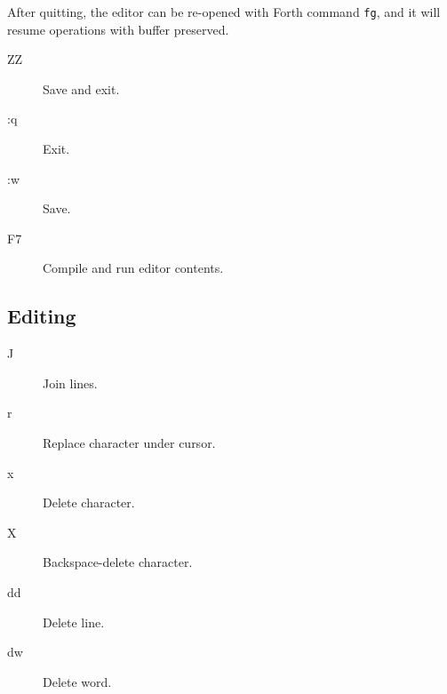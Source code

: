 After quitting, the editor can be re-opened with Forth command \texttt{fg}, and it will resume operations with buffer preserved.

\begin{description}
\item[ZZ] Save and exit.
\item[:q] Exit.
\item[:w] Save.
\item[F7] Compile and run editor contents.
\end{description}

\subsection{Editing}
\begin{description}
\item[J] Join lines.
\item[r] Replace character under cursor.
\item[x] Delete character.
\item[X] Backspace-delete character.
\item[dd] Delete line.
\item[dw] Delete word.
\end{description}

